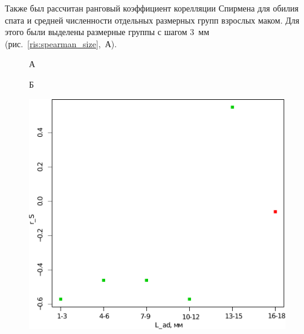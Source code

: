 Также был рассчитан ранговый коэффициент корелляции Спирмена для обилия спата и средней численности отдельных размерных групп взрослых маком. 
Для этого были выделены размерные группы с шагом $3$~мм (рис.~\ref{ris:spearman_size},~А).
	\begin{figure}[p]
	\begin{minipage}[b]{.46\linewidth}
	\begin{center}
	А
	\end{center}
	\end{minipage}
	\hfil %
	\begin{minipage}[b]{.46\linewidth}
	\begin{center}
	Б
	\end{center}
	\end{minipage}
	\begin{minipage}[b]{.46\linewidth}
	\begin{center}
		\includegraphics[width=\textwidth]{../White_Sea/spat/spearman_spat_3mm_1.pdf}
	\end{center}
	\end{minipage}
%
	\hfil %
	\begin{minipage}[b]{.46\linewidth}

\end{minipage}
\end{figure}
